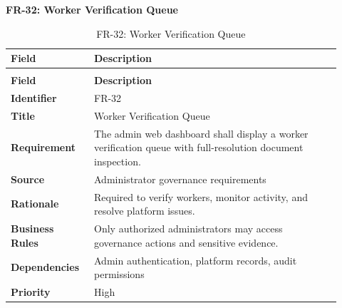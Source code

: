 \documentclass[12pt,a4paper]{article}
\begin{document}
\noindent\textbf{FR-32: Worker Verification Queue}\par
\vspace{4pt}
\begingroup\small\setlength{\tabcolsep}{4pt}\renewcommand{\arraystretch}{1.15}
\begin{longtable}{|>{\raggedright\arraybackslash}p{0.22\linewidth}|>{\raggedright\arraybackslash}p{0.70\linewidth}|}
\caption{FR-32: Worker Verification Queue}\label{tab:fr-32}\\
\hline
\textbf{Field} & \textbf{Description} \\ \hline
\endfirsthead
\multicolumn{2}{c}{Table \thetable\ Worker Verification Queue (continued)}\\
\hline
\textbf{Field} & \textbf{Description} \\ \hline
\endhead
\textbf{Identifier} & FR-32 \\ \hline
\textbf{Title} & Worker Verification Queue \\ \hline
\textbf{Requirement} & The admin web dashboard shall display a worker verification queue with full-resolution document inspection. \\ \hline
\textbf{Source} & Administrator governance requirements \\ \hline
\textbf{Rationale} & Required to verify workers, monitor activity, and resolve platform issues. \\ \hline
\textbf{Business Rules} & Only authorized administrators may access governance actions and sensitive evidence. \\ \hline
\textbf{Dependencies} & Admin authentication, platform records, audit permissions \\ \hline
\textbf{Priority} & High \\ \hline
\end{longtable}
\endgroup
\clearpage
\end{document}
